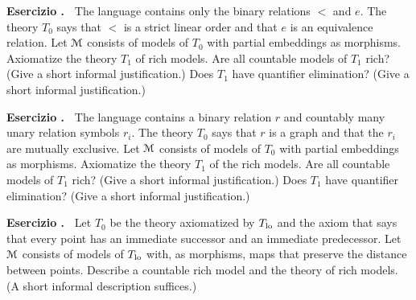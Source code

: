 \documentclass[10pt]{article}
\def\M{\EuScript M}
\newcounter{ex}
\newenvironment{exercise}{\bigskip\addtocounter{ex}{1}\textbf{Esercizio \theex.\ }}{}
\begin{document}
\begin{exercise}
  The language contains only the binary relations $<$ and $e$.
  The theory $T_0$ says that $<$ is a strict linear order and that $e$ is an equivalence relation.
  Let $\M$ consists of models of $T_0$ with partial embeddings as morphisms.
  Axiomatize the theory $T_1$ of rich models.
  Are all countable models of $T_1$ rich? (Give a short informal justification.)
  Does $T_1$ have quantifier elimination? (Give a short informal justification.)
\end{exercise}

\begin{exercise}
  The language contains a binary relation $r$ and countably many unary relation symbols $r_i$.
  The theory $T_0$ says that $r$ is a graph and that the $r_i$ are mutually exclusive.
  Let $\M$ consists of models of $T_0$ with partial embeddings as morphisms.
  Axiomatize the theory $T_1$ of the rich models.
  Are all countable models of $T_1$ rich? (Give a short informal justification.)
  Does $T_1$ have quantifier elimination? (Give a short informal justification.)
\end{exercise}

\begin{exercise}
  Let $T_0$ be the theory axiomatized by $T_{\rm lo}$ and the axiom that says that every point has an immediate successor and an immediate predecessor.
  Let $\M$ consists of models of $T_{\rm lo}$ with, as morphisms, maps that preserve the distance between points.
  Describe a countable rich model and the theory of rich models. (A short informal description suffices.)
\end{exercise}
\end{document}
